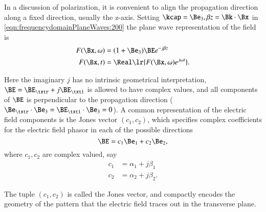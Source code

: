 %
%
In a discussion of polarization, it is convenient to align the propagation direction along a fixed direction, usually the z-axis.
Setting \( \kcap = \Be_3, \beta z = \Bk \cdot \Bx \) in \cref{eqn:frequencydomainPlaneWaves:200} the plane wave representation of the field is
\begin{dmath}\label{eqn:polarization:20}
\begin{aligned}
F(\Bx, \omega) &= (1 + \Be_3) \BE e^{-j \beta z} \\
F(\Bx, t) &= \Real\lr{ F(\Bx, \omega) e^{j \omega t} }.
\end{aligned}
\end{dmath}

Here the imaginary \( j \) has no intrinsic geometrical interpretation, \( \BE = \BE_\txtr + j \BE_\txti \) is allowed to have complex values, and all components of \( \BE \) is perpendicular to the propagation direction (\( \Be_\txtr \cdot \Be_3 = \BE_\txti \cdot \Be_3 = 0 \)).
A common representation of the electric field components is the Jones vector \( (c_1, c_2) \), which specifies complex coefficients for the electric field phasor in each of the possible directions
\begin{dmath}\label{eqn:polarization:120}
\BE = c_1 \Be_1 + c_2 \Be_2,
\end{dmath}
where \( c_1, c_2 \) are complex valued, say
\begin{dmath}\label{eqn:polarization:140}
\begin{aligned}
c_1 &= \alpha_1 + j \beta_1 \\
c_2 &= \alpha_2 + j \beta_2.
\end{aligned}
\end{dmath}

The tuple \( (c_1, c_2) \) is called the Jones vector, and compactly encodes the geometry of the pattern that the electric field traces out in the transverse plane.
